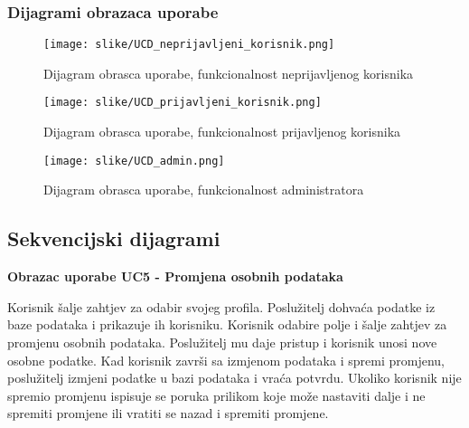 				\eject
				
					
				\subsubsection{Dijagrami obrazaca uporabe}
					

				\begin{figure}[H]
					\texttt{[image: slike/UCD\_neprijavljeni\_korisnik.png]}
					\centering
					\caption{Dijagram obrasca uporabe, funkcionalnost neprijavljenog korisnika}
					\label{fig:neprijavljeni_korisnik}
				\end{figure}
				
				\begin{figure}[H]
					\texttt{[image: slike/UCD\_prijavljeni\_korisnik.png]}
					\centering
					\caption{Dijagram obrasca uporabe, funkcionalnost prijavljenog korisnika}
					\label{fig:prijavljeni_korisnik}
				\end{figure}
				
				\begin{figure}[H]
					\texttt{[image: slike/UCD\_admin.png]}
					\centering
					\caption{Dijagram obrasca uporabe, funkcionalnost administratora}
					\label{fig:admin}
				\end{figure}

				\eject		
				
			\subsection{Sekvencijski dijagrami}
				
%				

			\textbf{Obrazac uporabe UC5 - Promjena osobnih podataka}
				
				\text Korisnik šalje zahtjev za odabir svojeg profila. Poslužitelj dohvaća podatke iz baze podataka i prikazuje ih korisniku. Korisnik odabire polje i šalje zahtjev za promjenu osobnih podataka. Poslužitelj mu daje pristup i korisnik unosi nove osobne podatke. Kad korisnik završi sa izmjenom podataka i spremi promjenu, poslužitelj izmjeni podatke u bazi podataka i vraća potvrdu. Ukoliko korisnik nije spremio promjenu ispisuje se poruka prilikom koje može nastaviti dalje i ne spremiti promjene ili vratiti se nazad i spremiti promjene.
				
